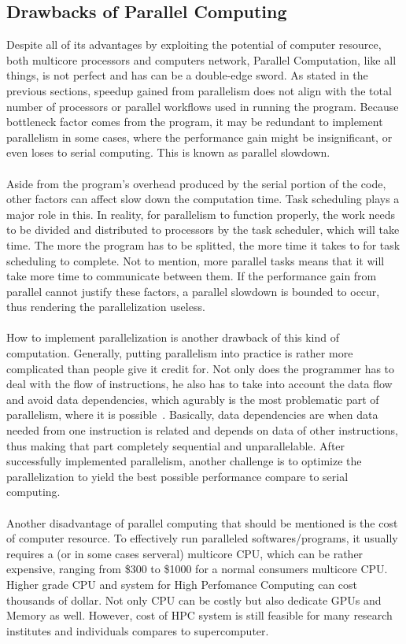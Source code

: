 \subsection{Drawbacks of Parallel Computing}
Despite all of its advantages by exploiting the potential of computer resource, both multicore processors and computers network, Parallel Computation, like all things, is not perfect and has can be a double-edge sword. As stated in the previous sections, speedup gained from parallelism does not align with the total number of processors or parallel workflows used in running the program. Because bottleneck factor comes from the program, it may be redundant to implement parallelism in some cases, where the performance gain might be insignificant, or even loses to serial computing. This is known as parallel slowdown. \\
~\\
Aside from the program's overhead produced by the serial portion of the code, other factors can affect slow down the computation time. Task scheduling plays a major role in this. In reality, for parallelism to function properly, the work needs to be divided and distributed to processors by the task scheduler, which will take time. The more the program has to be splitted, the more time it takes to for task scheduling to complete. Not to mention, more parallel tasks means that it will take more time to communicate between them. If the performance gain from parallel cannot justify these factors, a parallel slowdown is bounded to occur, thus rendering the parallelization useless. \\
~\\
How to implement parallelization is another drawback of this kind of computation. Generally, putting parallelism into practice is rather more complicated than people give it credit for. Not only does the programmer has to deal with the flow of instructions, he also has to take into account the data flow and avoid data dependencies, which agurably is the most problematic part of parallelism, where it is possible~\cite{intro_parallel}. Basically, data dependencies are when data needed from one instruction is related and depends on data of other instructions, thus making that part completely sequential and unparallelable. After successfully implemented parallelism, another challenge is to optimize the parallelization to yield the best possible performance compare to serial computing. \\
~\\
Another disadvantage of parallel computing that should be mentioned is the cost of computer resource. To effectively run paralleled softwares/programs, it usually requires a (or in some cases serveral) multicore CPU, which can be rather expensive, ranging from \$300 to \$1000 for a normal consumers multicore CPU. Higher grade CPU and system for High Perfomance Computing can cost thousands of dollar. Not only CPU can be costly but also dedicate GPUs and Memory as well. However, cost of HPC system is still feasible for many research institutes and individuals compares to supercomputer. \\


